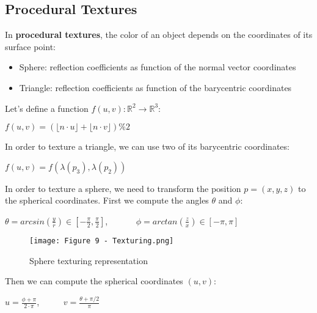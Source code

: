 \documentclass{article}
\begin{document}
\subsection{Procedural Textures}
In \textbf{procedural textures}, the color of an object depends on the coordinates of its surface point:
\begin{itemize}
    \item Sphere: reflection coefficients as function of the normal vector coordinates
    \item Triangle: reflection coefficients as function of the barycentric coordinates
\end{itemize}
Let's define a function $f(u,v):\mathbb{R}^2 \rightarrow \mathbb{R}^3$:
\begin{center}
    $f(u,v) = (\lfloor n \cdot u \rfloor + \lfloor n \cdot v \rfloor) \% 2$
\end{center}
In order to texture a triangle, we can use two of its barycentric coordinates:
\begin{center}
    $f(u,v)=f(\lambda(p_3),\lambda(p_2))$
\end{center}
In order to texture a sphere, we need to transform the position $p=(x,y,z)$ to the spherical coordinates.
First we compute the angles $\theta$ and $\phi$:
\begin{center}
    $\theta = arcsin(\displaystyle\frac{y}{r}) \in [-\displaystyle\frac{\pi}{2}, \displaystyle\frac{\pi}{2}]$, \ \ \ \ \ \ $\phi = arctan(\displaystyle\frac{z}{x}) \in [-\pi, \pi] $
\end{center}
\begin{figure}[H]
    \centering
    \texttt{[image: Figure 9 - Texturing.png]}
    \caption{Sphere texturing representation}
\end{figure}
Then we can compute the spherical coordinates $(u,v)$:
\begin{center}
    $u=\displaystyle\frac{\phi + \pi}{2 \cdot \pi}$, \ \ \ \ \ $v = \displaystyle\frac{\theta + \pi/2}{\pi}$
\end{center}

\newpage

\end{document}

